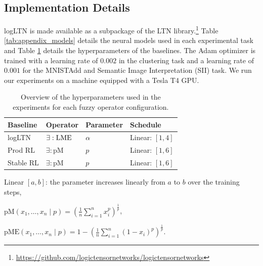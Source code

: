 \subsection{Implementation Details}
\label{appendix:implementation}

logLTN is made available as a subpackage of the LTN library.\footnote{\url{https://github.com/logictensornetworks/logictensornetworks}}
Table \ref{tab:appendix_models} details the neural models used in each experimental task and Table \ref{tab:appendix_operator_params} details the hyperparameters of the baselines.
The Adam optimizer is trained with a learning rate of $0.002$ in the clustering task and a learning rate of $0.001$ for the MNISTAdd and Semantic Image Interpretation (SII) task.
We run our experiments on a machine equipped with a Tesla T4 GPU.

\begin{table}
    \begin{center}
    \begin{tabular}{llll}
        \toprule
        Baseline  & Operator & Parameter & Schedule \\
        \midrule
        logLTN & $\exists: \operatorname{LME}$ & $\alpha$ & Linear: $[1,4]$\\
        Prod RL & $\exists: \mathrm{pM}$ & $p$ &  Linear: $[1,6]$\\
        Stable RL & $\exists: \mathrm{pM}$ & $p$ &  Linear: $[1,6]$\\
        \bottomrule
    \end{tabular}
    \end{center}
    
    \begin{tablenotes}
        \small
        \item Linear $[a,b]$: the parameter increases linearly from $a$ to $b$ over the training steps,
        \item $\mathrm{pM}(x_1, \dots, x_n \mid p) = (\frac{1}{n} \sum_{i=1}^{n} x_i^p)^{\frac{1}{p}}$,
        \item $\mathrm{pME}(x_1, \dots, x_n \mid p) = 1 - (\frac{1}{n} \sum_{i=1}^{n} (1- x_i)^p)^{\frac{1}{p}}$.
      \end{tablenotes}
    \caption{Overview of the hyperparameters used in the experiments for each fuzzy operator configuration.}
    \label{tab:appendix_operator_params}
\end{table}

\newcommand{\Conv}{\mathrm{Conv}}
\newcommand{\Dense}{\mathrm{Dense}}

